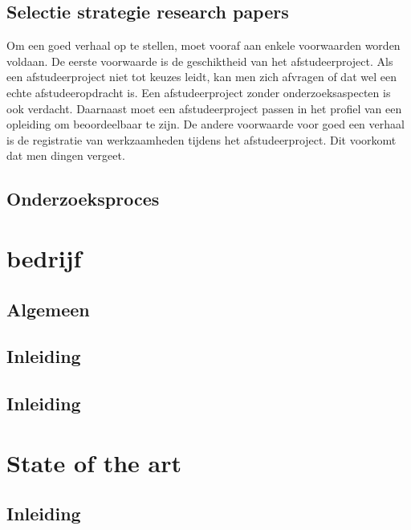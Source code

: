 \section{Selectie strategie research papers}
Om een goed verhaal op te stellen, moet vooraf aan enkele voorwaarden
worden voldaan. De eerste voorwaarde is de geschiktheid van het
afstudeerproject. Als een afstudeerproject niet tot keuzes leidt, kan
men zich afvragen of dat wel een echte afstudeeropdracht is. Een
afstudeerproject zonder onderzoeksaspecten is ook verdacht. Daarnaast
moet een afstudeerproject passen in het profiel van een opleiding om
beoordeelbaar te zijn. De andere voorwaarde voor goed een verhaal is
de registratie van werkzaamheden tijdens het afstudeerproject. Dit
voorkomt dat men dingen vergeet.
\section{Onderzoeksproces}
 



\chapter{bedrijf}
\section{Algemeen}
 
 
 \section{Inleiding}
 
 
 
 \section{Inleiding}

\chapter{State of the art}


\section{Inleiding}

